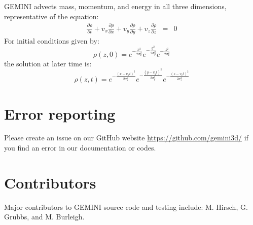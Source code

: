 \documentclass[11pt,letterpaper]{article}
\begin{document}
GEMINI advects mass, momentum, and energy in all three dimensions, representative of the equation:  
\begin{eqnarray}
\frac{\partial \rho}{\partial t} + v_x \frac{\partial \rho}{\partial x} + v_y \frac{\partial \rho}{\partial y} + v_z \frac{\partial \rho}{\partial z} &=& 0 %
\end{eqnarray}
For initial conditions given by:
\begin{equation}
\rho(z,0)=e^{-\frac{x^2}{2 \sigma_x^2}}e^{-\frac{y^2}{2 \sigma_y^2}}e^{-\frac{z^2}{2 \sigma_z^2}}
\end{equation}
the solution at later time is:
\begin{equation}
\rho(z,t)=e^{-\frac{(x-v_x t)^2}{2 \sigma_x^2}}e^{-\frac{(y - v_y t)^2}{2 \sigma_y^2}}e^{-\frac{(z-v_z t)^2}{2 \sigma_z^2}}
\end{equation}


\section{Error reporting}

Please create an issue on our GitHub website \url{https://github.com/gemini3d/} if you find an error in our documentation or codes.  


\section{Contributors}

Major contributors to GEMINI source code and testing include:  M. Hirsch, G. Grubbs, and M. Burleigh.


\pagebreak

%
\end{document}
